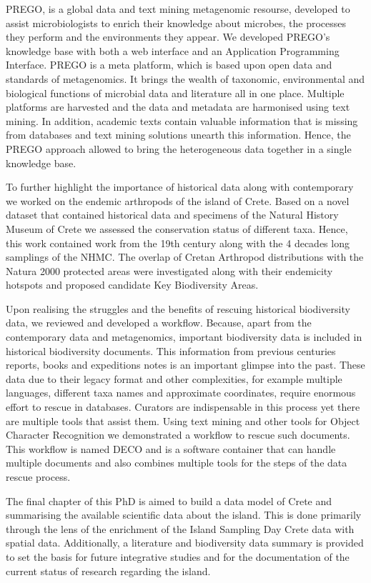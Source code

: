 \documentclass[
11pt, %
english, %
singlespacing, %
toctotoc, %
headsepline, %
]{MastersDoctoralThesis} %
\begin{document}
PREGO, is a global data and text mining metagenomic resourse, developed to assist microbiologists
to enrich their knowledge about microbes, the processes they perform and the environments 
they appear. We developed PREGO's knowledge base with both a web interface and an Application Programming Interface.
PREGO is a meta platform, which is based upon open data and standards of metagenomics. 
It brings the wealth of taxonomic, environmental and biological functions of 
microbial data and literature all in one place. Multiple platforms are harvested and the data 
and metadata are harmonised using text mining. In addition, academic texts contain 
valuable information that is missing from databases and text mining solutions unearth 
this information. Hence, the PREGO approach allowed to bring the heterogeneous
data together in a single knowledge base. 

To further highlight the importance of historical data along with contemporary we 
worked on the endemic arthropods of the island of Crete. Based on a novel dataset
that contained historical data and specimens of the Natural History Museum of Crete
we assessed the conservation status of different taxa. Hence, this work contained 
work from the 19th century along with the 4 decades long samplings of the NHMC. 
The overlap of Cretan Arthropod distributions with the Natura 2000 protected areas
were investigated along with their endemicity hotspots and proposed candidate Key Biodiversity Areas.

Upon realising the struggles and the benefits of rescuing historical biodiversity data, we 
reviewed and developed a workflow. Because, apart from the contemporary data and metagenomics, important biodiversity data is 
included in historical biodiversity documents. This information from 
previous centuries reports, books and expeditions notes is an important glimpse into
the past. These data due to their legacy format and other complexities, for example 
multiple languages, different taxa names and approximate coordinates, require 
enormous effort to rescue in databases. Curators are indispensable in this process 
yet there are multiple tools that assist them. Using text mining and other tools 
for Object Character Recognition we demonstrated a workflow to rescue such documents.
This workflow is named DECO and is a software container that can handle multiple 
documents and also combines multiple tools for the steps of the data rescue process.

The final chapter of this PhD is aimed to build a data model of Crete and summarising the 
available scientific data about the island. This is done primarily through the lens of the enrichment of
the Island Sampling Day Crete data with spatial data. Additionally, a literature and biodiversity data summary is 
provided to set the basis for future integrative studies and for the documentation of the current status of 
research regarding the island.
\end{document}
